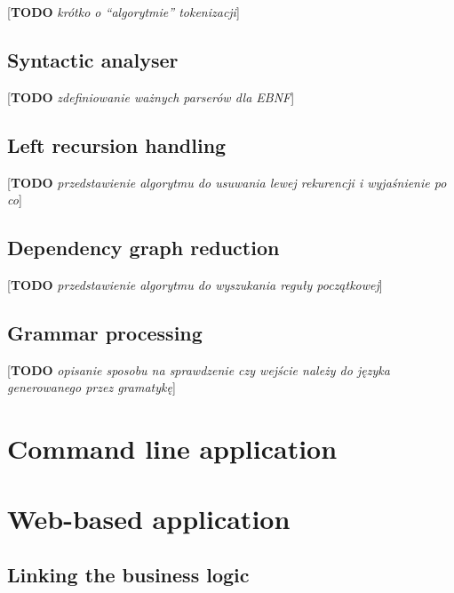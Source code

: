 \documentclass[english,engineering]{wizthesis}
\newcommand{\todo}[1]{{\color{red}[\textbf{TODO} \textit{#1}]}}
\begin{document}
\todo{krótko o ``algorytmie'' tokenizacji}

\subsection{Syntactic analyser}

\todo{zdefiniowanie ważnych parserów dla EBNF}

\subsection{Left recursion handling}

\todo{przedstawienie algorytmu do usuwania lewej rekurencji i wyjaśnienie po co}


\subsection{Dependency graph reduction}

\todo{przedstawienie algorytmu do wyszukania reguły początkowej}

\subsection{Grammar processing}

\todo{opisanie sposobu na sprawdzenie czy wejście należy do języka generowanego
przez gramatykę}

\section{Command line application}

\section{Web-based application}

\subsection{Linking the business logic}
\end{document}
